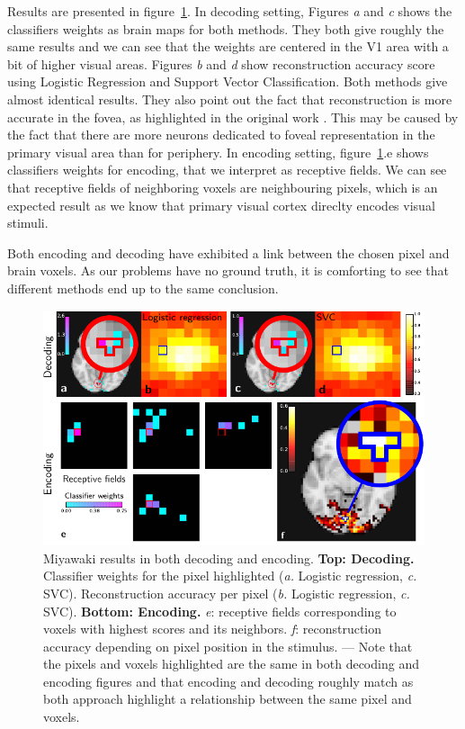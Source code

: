 \documentclass{frontiersSCNS} %
\begin{document}
\label{sec:miyawaki_results}
Results are presented in figure~\ref{fig:miyawaki}.
In decoding setting, Figures \textit{a} and \textit{c} shows the classifiers weights as brain
maps for both methods. They both give roughly the same results and we can
see that the weights are centered in the V1 area with a bit of higher
visual areas.
Figures \textit{b} and \textit{d} show reconstruction
accuracy score using Logistic Regression and Support Vector Classification.
Both methods give almost identical results. They also point out the fact that reconstruction is more
accurate in the fovea, as highlighted
in the original work \citep{miyawaki2008}.
This may be caused by the fact that there are more neurons dedicated to foveal
representation in the primary visual area than for periphery.
In encoding setting, figure~\ref{fig:miyawaki}.e shows classifiers weights for encoding, that
we interpret as receptive fields. We can see that receptive fields of
neighboring voxels are neighbouring pixels, which is an expected result
as we know that primary visual cortex direclty encodes visual stimuli. 

Both encoding and decoding have exhibited a link between the chosen pixel and
brain voxels. As our problems have no ground truth, it is comforting to see that
different methods end up to the same conclusion.



\begin{figure}[hbtp]
  \begin{center}
    \includegraphics[width=\linewidth]{img/miyawaki/figure}
  \end{center}
  \caption{
      Miyawaki results in both decoding and encoding. 
      \textbf{Top: Decoding.} Classifier weights for the pixel
      highlighted (\textit{a.} Logistic regression, \textit{c.} SVC).
      Reconstruction accuracy per pixel 
      (\textit{b.} Logistic
      regression, \textit{c.} SVC). 
      \textbf{Bottom: Encoding.} \textit{e}: receptive fields corresponding to
       voxels with highest scores and its neighbors.
       \textit{f}: reconstruction accuracy depending on 
	  pixel position in the stimulus. --- Note that the pixels and voxels highlighted are the same in 
      both decoding and encoding figures and that encoding and decoding
      roughly match as both approach highlight a relationship between the
      same pixel and voxels.
}
\label{fig:miyawaki}
\end{figure}
\end{document}

